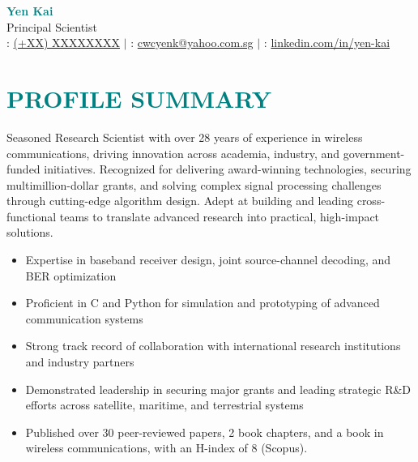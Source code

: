 \documentclass[a4paper, 11pt]{article}
\begin{document}
\begin{center}
	
	\textbf{\Huge \textcolor{teal}{Yen Kai}} \\ \vspace{3pt}
	\Large{Principal Scientist} \\ \vspace{3pt}
	\small
	\faPhone : \href{tel:XXXXXXXX}{(+XX) XXXXXXXX}
	$|$
	\faEnvelope : \href{mailto:cwcyenk@yahoo.com.sg}{cwcyenk@yahoo.com.sg}
	$|$
	\faLinkedinSquare : \href{https://linkedin.com/in/yen-kai}{linkedin.com/in/yen-kai}
	
\end{center}

\section{\textcolor{teal}{\bf{PROFILE SUMMARY}}}

	\vspace{3pt}
	
	Seasoned Research Scientist with over 28 years of experience in wireless communications, driving innovation across academia, industry, and government-funded initiatives. Recognized for delivering award-winning technologies, securing multimillion-dollar grants, and solving complex signal processing challenges through cutting-edge algorithm design. Adept at building and leading cross-functional teams to translate advanced research into practical, high-impact solutions.  
	
	\vspace{2pt}
	
	\begin{itemize}[leftmargin=*, itemsep=-1mm]
		
		\item Expertise in baseband receiver design, joint source-channel decoding, and BER optimization
		\item Proficient in C and Python for simulation and prototyping of advanced communication systems
		\item Strong track record of collaboration with international research institutions and industry partners 
		\item Demonstrated leadership in securing major grants and leading strategic R\&D efforts across satellite, maritime, and terrestrial systems 
		\item Published over 30 peer-reviewed papers, 2 book chapters, and a book in wireless communications, with an H-index of 8 (Scopus). 
		
	\end{itemize}
\end{document}
